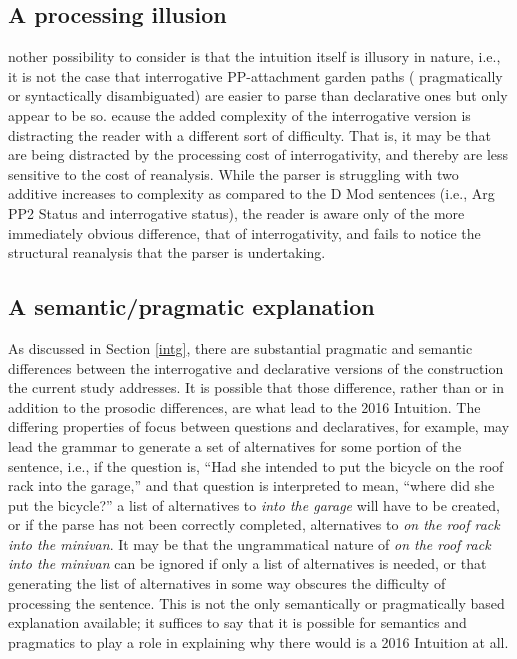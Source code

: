 \documentclass[12pt,oneside]{book}
\begin{document}
\hypertarget{a-processing-illusion}{%
\subsection{A processing illusion}\label{a-processing-illusion}}

 nother possibility to consider is that the intuition itself is illusory in nature, i.e., it is not the case that interrogative PP-attachment garden paths ( pragmatically or syntactically disambiguated) are easier to parse than declarative ones\added{,} but only appear to be so. ecause the added complexity of the interrogative version is distracting the reader with a different sort of difficulty. That is, it may be that  are being distracted by the processing cost of interrogativity, and thereby are less sensitive to the cost of reanalysis. While the parser is struggling with two additive increases to complexity as compared to the D Mod sentences (i.e., Arg PP2 Status and interrogative status), the reader is aware only of the more immediately obvious difference, that of interrogativity, and fails to  notice the structural reanalysis that the parser is undertaking.

\hypertarget{a-semanticpragmatic-explanation}{%
\subsection{A semantic/pragmatic explanation}\label{a-semanticpragmatic-explanation}}

As discussed in Section \ref{intg}, there are substantial pragmatic and semantic differences between the interrogative and declarative versions of the construction the current study addresses. It is possible that those difference, rather than or in addition to the prosodic differences, are what lead to the 2016 Intuition. The differing properties of focus between questions and declaratives, for example, may lead the grammar to generate a set of alternatives for some portion of the sentence, i.e., if the question is, ``Had she intended to put the bicycle on the roof rack into the garage,'' and that question is interpreted to mean, ``where did she put the bicycle?'' a list of alternatives to \emph{into the garage} will have to be created, or if the parse has not been correctly completed, alternatives to \emph{on the roof rack into the minivan}. It may be that the ungrammatical nature of \emph{on the roof rack into the minivan} can be ignored if only a list of alternatives is needed, or that generating the list of alternatives in some way obscures the difficulty of processing the sentence. This is not the only semantically or pragmatically based explanation available; it suffices to say that it is possible for semantics and pragmatics to play a role in explaining why there would is a 2016 Intuition at all.
\end{document}
